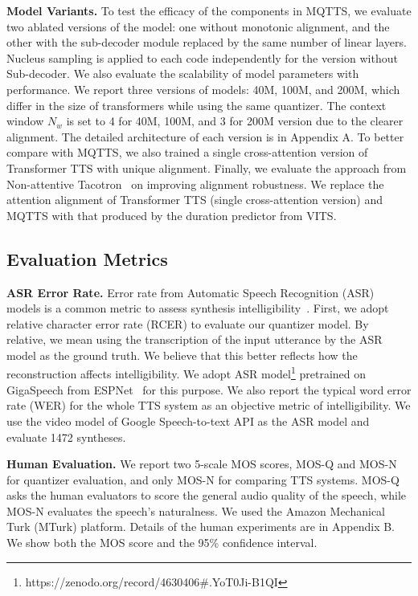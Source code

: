 \documentclass[letterpaper]{article}
\begin{document}
\textbf{Model Variants.}
To test the efficacy of the components in MQTTS, we evaluate two ablated versions of the model: one without monotonic alignment, and the other with the sub-decoder module replaced by the same number of linear layers.
Nucleus sampling is applied to each code independently for the version without Sub-decoder.
We also evaluate the scalability of model parameters with performance.
We report three versions of models: 40M, 100M, and 200M, which differ in the size of transformers while using the same quantizer.
The context window $N_w$ is set to 4 for 40M, 100M, and 3 for 200M version due to the clearer alignment.
The detailed architecture of each version is in Appendix A.
To better compare with MQTTS, we also trained a single cross-attention version of Transformer TTS with unique alignment.
Finally, we evaluate the approach from Non-attentive Tacotron~\cite{DBLP:journals/corr/abs-2010-04301} on improving alignment robustness.
We replace the attention alignment of Transformer TTS (single cross-attention version) and MQTTS with that produced by the duration predictor from VITS.

\subsection{Evaluation Metrics}

\textbf{ASR Error Rate.}
Error rate from Automatic Speech Recognition (ASR) models is a common metric to assess synthesis intelligibility~\cite{DBLP:conf/icassp/HayashiYIY0TTZT20}.
First, we adopt relative character error rate (RCER) to evaluate our quantizer model.
By relative, we mean using the transcription of the input utterance by the ASR model as the ground truth.
We believe that this better reflects how the reconstruction affects intelligibility.
We adopt ASR model\footnote{https://zenodo.org/record/4630406\#.YoT0Ji-B1QI} pretrained on GigaSpeech from ESPNet~\cite{watanabe2018espnet} for this purpose.
We also report the typical word error rate (WER) for the whole TTS system as an objective metric of intelligibility.
We use the video model of Google Speech-to-text API as the ASR model and evaluate 1472 syntheses.

\textbf{Human Evaluation.}
We report two 5-scale MOS scores, MOS-Q and MOS-N for quantizer evaluation, and only MOS-N for comparing TTS systems.
MOS-Q asks the human evaluators to score the general audio quality of the speech, while MOS-N evaluates the speech's naturalness.
We used the Amazon Mechanical Turk (MTurk) platform.
Details of the human experiments are in Appendix B.
We show both the MOS score and the 95\% confidence interval.
\end{document}
